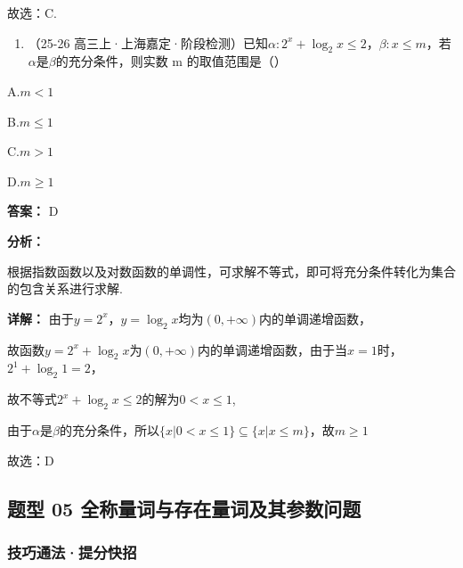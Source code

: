 \documentclass[11pt,a4paper]{ctexart}
\begin{document}
故选：C.

\begin{enumerate}[label=\arabic*., leftmargin=*, start=7]
\item （25-26
  高三上·上海嘉定·阶段检测）已知\(\alpha:2^{x}+\log_{2}x\leq2\)，\(\beta: x \leq m\)，若\(\alpha\)是\(\beta\)的充分条件，则实数
  m 的取值范围是（）
\end{enumerate}

A.\(m <   1\)

B.\(m \leq 1\)

C.\(m > 1\)

D.\(m \geq 1\)

\textbf{答案：}
D

\textbf{分析：}

根据指数函数以及对数函数的单调性，可求解不等式，即可将充分条件转化为集合的包含关系进行求解.

\textbf{详解：}
由于\(y = 2^{x}\)，\(y = \log_{2}x\)均为\((0, +\infty)\)内的单调递增函数，

故函数\(y = 2^{x} + \log_{2}x\)为\((0, +\infty)\)内的单调递增函数，由于当\(x = 1\)时，\(2^{1} + \log_{2}1 = 2\)，

故不等式\(2^{x}+ \log_{2}x \leq 2\)的解为\(0 < x \leq 1\),

由于\(\alpha\)是\(\beta\)的充分条件，所以\(\{x|0 < x \leq 1\} \subseteq \{x|x \leq m\}\)，故\(m \geq 1\)

故选：D\subsection{题型 05
全称量词与存在量词及其参数问题}\label{ux9898ux578b-05-ux5168ux79f0ux91cfux8bcdux4e0eux5b58ux5728ux91cfux8bcdux53caux5176ux53c2ux6570ux95eeux9898}

\subsubsection{技巧通法·提分快招}\label{ux6280ux5de7ux901aux6cd5ux63d0ux5206ux5febux62db-4}
\end{document}
